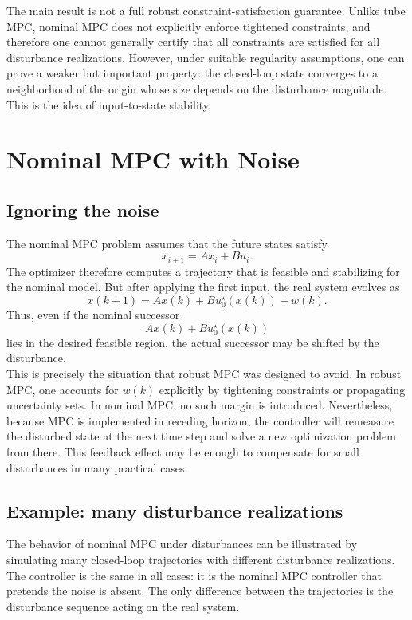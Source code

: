 The main result is not a full robust constraint-satisfaction guarantee. Unlike tube MPC, nominal
MPC does not explicitly enforce tightened constraints, and therefore one cannot generally certify
that all constraints are satisfied for all disturbance realizations. However, under suitable
regularity assumptions, one can prove a weaker but important property: the closed-loop state
converges to a neighborhood of the origin whose size depends on the disturbance magnitude.
This is the idea of input-to-state stability.

\section{Nominal MPC with Noise}

\subsection{Ignoring the noise}

The nominal MPC problem assumes that the future states satisfy
\[
    x_{i+1}=Ax_i+Bu_i.
\]
The optimizer therefore computes a trajectory that is feasible and stabilizing for the nominal
model. But after applying the first input, the real system evolves as
\[
    x(k+1)=Ax(k)+Bu_0^\star(x(k))+w(k).
\]
Thus, even if the nominal successor
\[
    Ax(k)+Bu_0^\star(x(k))
\]
lies in the desired feasible region, the actual successor may be shifted by the disturbance.\\

This is precisely the situation that robust MPC was designed to avoid. In robust MPC, one
accounts for \(w(k)\) explicitly by tightening constraints or propagating uncertainty sets. In
nominal MPC, no such margin is introduced. Nevertheless, because MPC is implemented in
receding horizon, the controller will remeasure the disturbed state at the next time step and
solve a new optimization problem from there. This feedback effect may be enough to compensate
for small disturbances in many practical cases.

\subsection{Example: many disturbance realizations}

The behavior of nominal MPC under disturbances can be illustrated by simulating many
closed-loop trajectories with different disturbance realizations. The controller is the same in all
cases: it is the nominal MPC controller that pretends the noise is absent. The only difference
between the trajectories is the disturbance sequence acting on the real system.\\

